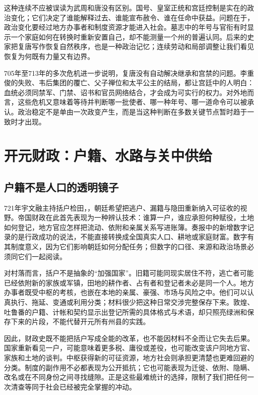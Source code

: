 这种连续不应被误读为武周和唐没有区别。国号、皇室正统和宫廷控制是实在的政治变化；它们决定了谁能解释过去、谁能宣布赦令、谁在任命中获益。问题在于，政治变化要经过地方办事者和制度资源才能进入社会。墓志中的年号与官衔有时显示一个家庭如何在转换时重新安置自己，却不能测量一个州的普遍认同。后来的史家把复唐写作恢复自然秩序，也是一种政治记忆；连续劳动和局部调整让我们看见恢复为何既有力量又有边界。

705年至713年的多次危机进一步说明，复唐没有自动解决继承和宫禁的问题。李重俊的失败、韦后集团的覆亡、父子禅位和太平公主的结局，都让宫廷中的人明白：血统必须同禁军、门禁、诏书和官员网络结合，才会成为可实行的权力。对外地而言，这些危机又意味着等待并判断哪一批使者、哪一种年号、哪一道命令可以被承认。政治稳定不是单由一次政变产生，而是当这种判断在多数关键节点暂时趋于一致时才出现。

\section{开元财政：户籍、水路与关中供给}
\label{sec:kaiyuan-finance-transport-extended}
\subsection{户籍不是人口的透明镜子}
721年宇文融主持括户检田，，朝廷希望把逃户、漏籍与隐田重新纳入可征收的视野。帝国财政在此首先表现为一种辨认技术：谁算一户，谁应承担何种赋役，土地如何登记，地方官应怎样把流动、依附和亲属关系写进账簿。奏报中的新增数字记录的是行政成功的说法，不能直接转换成全国真实人口、耕地或家庭财富。数字有其制度意义，因为它们影响朝廷如何分配任务；但数字的口径、来源和政治场景必须同它们一起阅读。

对村落而言，括户不是抽象的“加强国家”。旧籍可能同现实居住不符，逃亡者可能已经依附新的家族或军镇，田地的耕作者、占有者和登记者未必是同一个人。地方办事者既受中枢的考核，也嵌在本地的亲属、豪强、市场与风险之中。他们可以认真执行、拖延、变通或利用分类；材料很少把这种日常交涉完整保存下来。敦煌、吐鲁番的户籍、计帐和契约显示出登记所需的具体格式与术语，却只照亮绿洲和保存下来的片段，不能代替开元所有州县的实践。

因此，财政史既不能把括户写成全能的改革，也不能因材料不全而让它失去后果。国家重新看见一户，可能意味着更多税、庸役或差役，也可能改变该户同地方官、家族和土地的谈判。中枢获得新的可征资源，地方社会则承担更清楚也更难回避的分类。制度的副作用不必都表现为公开抵抗；它也可能表现为迁徙、依附、隐瞒、改名或在不同身份之间寻找缝隙。正是这些最难统计的选择，限制了我们把任何一次清查等同于社会已经被完全掌握的冲动。

